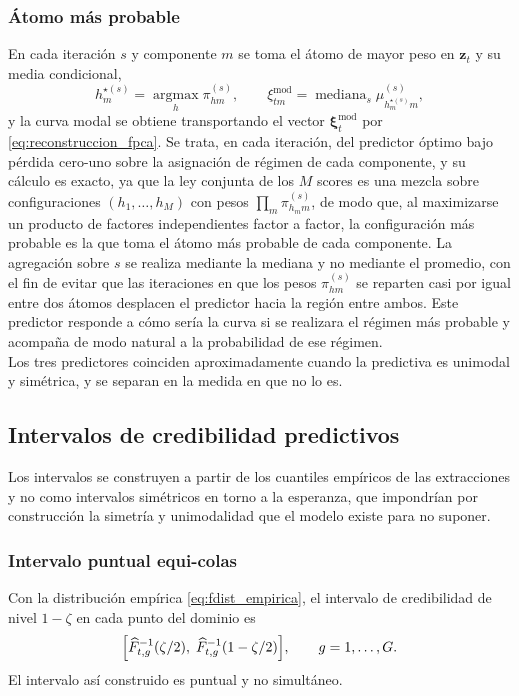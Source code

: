 \subsubsection{Átomo más probable}
\label{03_05_04_02_atomo_modal}
 En cada iteración $s$ y componente $m$ se toma el átomo de mayor peso en $\mathbf{z}_t$ y su media condicional,
\begin{equation}\label{eq:atomo_modal}
    h_m^{\star(s)} = \operatorname*{argmax}_{h} \pi_{hm}^{(s)},
    \qquad
    \xi_{tm}^{\mathrm{mod}} = \operatorname{mediana}_{s}\mu_{h_m^{\star(s)} m}^{(s)},
\end{equation}
y la curva modal se obtiene transportando el vector $\boldsymbol{\xi}_t^{\mathrm{mod}}$ por \eqref{eq:reconstruccion_fpca}. Se trata, en cada iteración, del predictor óptimo bajo pérdida cero-uno sobre la asignación de régimen de cada componente, y su cálculo es exacto, ya que la ley conjunta de los $M$ scores es una mezcla sobre configuraciones $(h_1, \dots, h_M)$ con pesos $\prod_m \pi_{h_m m}^{(s)}$, de modo que, al maximizarse un producto de factores independientes factor a factor, la configuración más probable es la que toma el átomo más probable de cada componente. La agregación sobre $s$ se realiza mediante la mediana y no mediante el promedio, con el fin de evitar que las iteraciones en que los pesos $\pi_{hm}^{(s)}$ se reparten casi por igual entre dos átomos desplacen el predictor hacia la región entre ambos. Este predictor responde a cómo sería la curva si se realizara el régimen más probable y acompaña de modo natural a la probabilidad de ese régimen.\\

Los tres predictores coinciden aproximadamente cuando la predictiva es unimodal y simétrica, y se separan en la medida en que no lo es. 

\subsection{Intervalos de credibilidad predictivos}
\label{03_05_05_intervalos_predictivos}

Los intervalos se construyen a partir de los cuantiles empíricos de las extracciones y no como intervalos simétricos en torno a la esperanza, que impondrían por construcción la simetría y unimodalidad que el modelo existe para no suponer.\\


\subsubsection{Intervalo puntual equi-colas}
\label{03_05_05_01_equicolas}
Con la distribución empírica \eqref{eq:fdist_empirica}, el intervalo de credibilidad de nivel $1-\zeta$ en cada punto del dominio es
\begin{equation}\label{eq:intervalo_puntual}
    \Bigl[\widehat{F}_{t,g}^{-1}(\zeta/2),\;
    \widehat{F}_{t,g}^{-1}(1-\zeta/2)\Bigr],
    \qquad g = 1, \dots, G.
\end{equation}
El intervalo así construido es puntual y no simultáneo.

